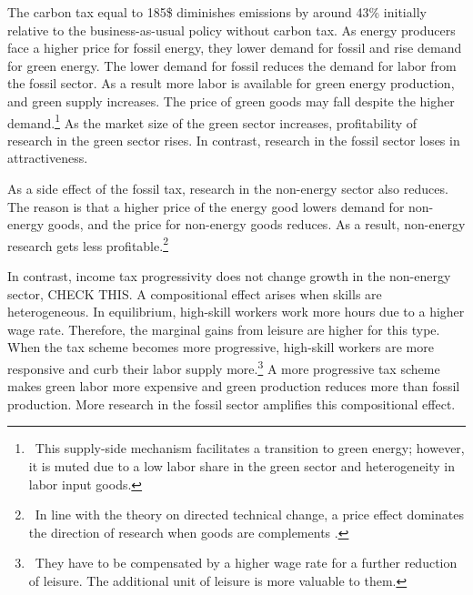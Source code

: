  The carbon tax equal to 185\$ diminishes emissions by around 43\% initially relative to the business-as-usual policy without carbon tax. As energy producers face a higher price for fossil energy, they lower demand for fossil and rise demand for green energy. The lower demand for fossil reduces the demand for labor from the fossil sector. As a result more labor is available for green energy production, and green supply increases. The price of green goods may fall despite the higher demand.\footnote{\ This supply-side mechanism facilitates a transition to green energy; however, it is muted due to a low labor share in the green sector and heterogeneity in labor input goods.}
 As the market size of the green sector increases, profitability of research in the green sector rises. In contrast, research in the fossil sector loses in attractiveness. 
 
 As a side effect of the fossil tax, research in the non-energy sector also reduces. The reason is that a higher price of the energy good lowers demand for non-energy goods, and the price for non-energy goods reduces. As a result, non-energy research gets less profitable.\footnote{\ In line with the theory on directed technical change, a price effect dominates the direction of research when goods are complements \citep{Hemous2021DirectedEconomics}.} 
 
 In contrast, income tax progressivity does not change growth in the non-energy sector, CHECK THIS. A compositional effect arises when skills are heterogeneous. In equilibrium, high-skill workers work more hours due to a higher wage rate. Therefore, the marginal gains from leisure are higher for this type. When the tax scheme becomes more progressive, high-skill workers are more responsive and curb their labor supply more.\footnote{\ They have to be compensated by a higher wage rate for a further reduction of leisure. The additional unit of leisure is more valuable to them.}  A more progressive tax scheme makes green labor more expensive and green production reduces more than fossil production. More research in the fossil sector amplifies this compositional effect. %
 
